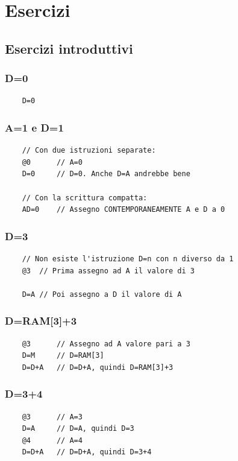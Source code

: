 \documentclass[12pt]{article}
\begin{document}
\pagebreak
\section{Esercizi}

\subsection{Esercizi introduttivi}

\subsubsection{D=0}
\begin{lstlisting}
    D=0
\end{lstlisting}

\subsubsection{A=1 e D=1}
\begin{lstlisting}
    // Con due istruzioni separate:
    @0      // A=0
    D=0     // D=0. Anche D=A andrebbe bene

    // Con la scrittura compatta:
    AD=0    // Assegno CONTEMPORANEAMENTE A e D a 0
\end{lstlisting}

\subsubsection{D=3}
\begin{lstlisting}
    // Non esiste l'istruzione D=n con n diverso da 1
    @3  // Prima assegno ad A il valore di 3

    D=A // Poi assegno a D il valore di A
\end{lstlisting}

\subsubsection{D=RAM[3]+3}
\begin{lstlisting}
    @3      // Assegno ad A valore pari a 3
    D=M     // D=RAM[3]
    D=D+A   // D=D+A, quindi D=RAM[3]+3
\end{lstlisting}

\subsubsection{D=3+4}
\begin{lstlisting}
    @3      // A=3
    D=A     // D=A, quindi D=3
    @4      // A=4
    D=D+A   // D=D+A, quindi D=3+4
\end{lstlisting}
\end{document}
